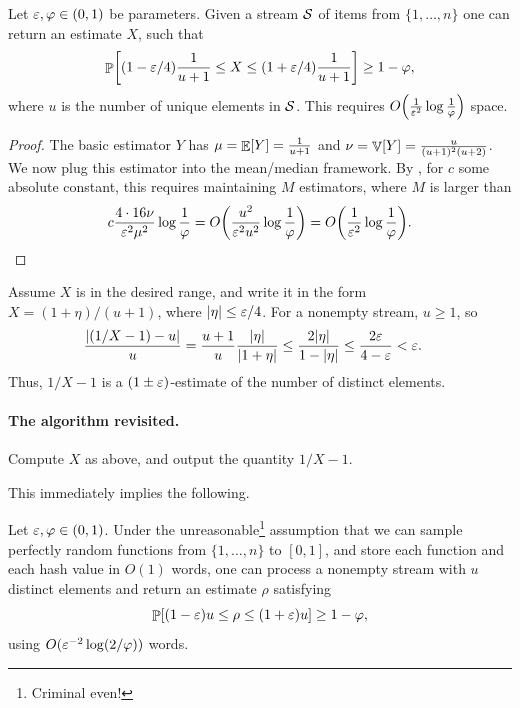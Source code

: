 \begin{lemma}
    Let ${\varepsilon}, \varphi \in (0,1)$ be parameters. Given a stream
    $\mathcal{S}$ of items from $\{1,\ldots, n\}$ one can return an estimate
    $X$, such that
    \begin{equation}
        \Prob{ (1-\eps/4)\frac{1}{u+1} \leq X \leq
           (1+\eps/4)\frac{1}{u+1}} \geq 1-\BadProb,
        \eqlab{range-est}
    \end{equation}
    where $u$ is the
    number of unique elements in $\mathcal{S}$. This requires
    $O\pth{ \frac{1 }{\eps^2 } \log \frac{1}{\BadProb}}$ space.
\end{lemma}
\begin{proof}
    The basic estimator $Y$ has $\mu = \mathop{\mathbb{E}}\!\left[ {Y} \right] = \frac{1}{u+1}$ and
    $\nu = \mathop{\mathbb{V}}\!\left[ {Y} \right]=\frac{u}{(u+1)^2 (u+2)}$. We now plug this
    estimator into the mean/median framework. By ,
    for $c$ some absolute constant, this requires maintaining $M$
    estimators, where $M$ is larger than
    \begin{equation*}
        c \frac{4\cdot 16 \nu}{\eps^2 \mu^2 } \log \frac{1}{\BadProb}
        = 
        O\pth{  \frac{u^2 }{\eps^2 u^2 } \log \frac{1}{\BadProb}}
        = 
        O\pth{  \frac{1 }{\eps^2  } \log \frac{1}{\BadProb}}.
    \end{equation*}
\end{proof}

Assume $X$ is in the desired range, and write it in the form
$X = (1+\eta)/(u+1)$, where $|\eta|\leq{\varepsilon}/4$. For a nonempty stream, $u\geq1$, so
\begin{align*}
    \frac{|(1/X-1)-u|}{u}
    &= \frac{u+1}{u}\frac{|\eta|}{|1+\eta|}
    \leq \frac{2|\eta|}{1-|\eta|}
    \leq \frac{2{\varepsilon}}{4-{\varepsilon}}<{\varepsilon}.
\end{align*}
Thus, $1/X-1$ is a $(1\pm{\varepsilon})$-estimate of the number of distinct
elements.

\paragraph*{The algorithm revisited.}
Compute $X$ as above, and output the quantity $1/X-1$.

\bigskip

This immediately implies the following.

\begin{lemma}
    Let ${\varepsilon},\varphi\in(0,1)$. Under the unreasonable\footnote{Criminal
       even!} assumption that we can sample perfectly random functions
    from $\{1,\ldots,n\}$ to $[0,1]$, and store each function and each hash
    value in $O(1)$ words, one can process a nonempty stream with $u$
    distinct elements and return an estimate $\rho$ satisfying
    \[
        \Prob{(1-\eps)u\leq\rho\leq(1+\eps)u}\geq1-\BadProb,
    \]
    using $O({\varepsilon}^{-2}\log(2/\varphi))$ words.
\end{lemma}

